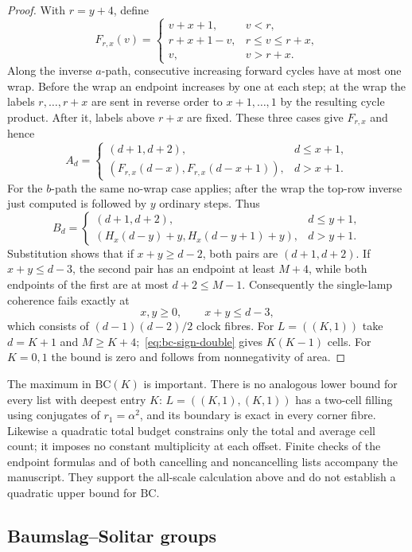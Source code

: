 \documentclass[11pt,a4paper]{article}
\theoremstyle{plain}
\theoremstyle{definition}
\theoremstyle{remark}
\begin{document}
\begin{proof}
With $r=y+4$, define
\[
 F_{r,x}(v)=\begin{cases}
 v+x+1,&v<r,\\
 r+x+1-v,&r\le v\le r+x,\\
 v,&v>r+x.
 \end{cases}
\]
Along the inverse $a$-path, consecutive increasing forward cycles have at most one wrap. Before the wrap an endpoint increases by one at
each step; at the wrap the labels $r,\ldots,r+x$ are sent in reverse order to $x+1,\ldots,1$ by the resulting cycle product. After it, labels above $r+x$ are fixed.
These three cases give $F_{r,x}$ and hence
\[
 A_d=\begin{cases}(d+1,d+2),&d\le x+1,\\
 (F_{r,x}(d-x),F_{r,x}(d-x+1)),&d>x+1.
 \end{cases}
\]
For the $b$-path the same no-wrap case applies; after the wrap the top-row inverse just computed is followed by $y$ ordinary steps. Thus
\[
 B_d=\begin{cases}(d+1,d+2),&d\le y+1,\\
 (H_x(d-y)+y,H_x(d-y+1)+y),&d>y+1.
 \end{cases}
\]
Substitution shows that if $x+y\ge d-2$, both pairs are $(d+1,d+2)$.
If $x+y\le d-3$, the second pair has an endpoint at least $M+4$, while both endpoints of the first are at most $d+2\le M-1$.
Consequently the single-lamp coherence fails exactly at
\[
 x,y\ge0,\qquad x+y\le d-3,
\]
which consists of $(d-1)(d-2)/2$ clock fibres.
For $L=((K,1))$ take $d=K+1$ and $M\ge K+4$;~\eqref{eq:bc-sign-double} gives $K(K-1)$ cells.
For $K=0,1$ the bound is zero and follows from nonnegativity of area.
\end{proof}

The maximum in $\mathrm{BC}(K)$ is important. There is no analogous lower bound for every list with deepest entry $K$:
$L=((K,1),(K,1))$ has a two-cell filling using conjugates of $r_1=\alpha^2$, and its boundary is exact in every corner fibre.
Likewise a quadratic total budget constrains only the total and average cell count; it imposes no constant multiplicity at each offset.
Finite checks of the endpoint formulas and of both cancelling and noncancelling lists accompany the manuscript.
They support the all-scale calculation above and do not establish a quadratic upper bound for $\mathrm{BC}$.


\subsection{Baumslag--Solitar groups}\label{sec:bs}
\end{document}
